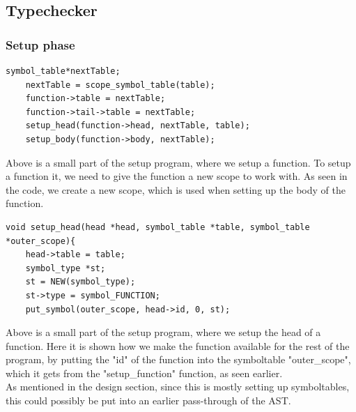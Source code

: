 \documentclass[a4paper,10pt,titlepage]{report}
\begin{document}
\newpage

\subsection{Typechecker}
\subsubsection{Setup phase}
\begin{lstlisting}
symbol_table*nextTable;
    nextTable = scope_symbol_table(table);
    function->table = nextTable;
    function->tail->table = nextTable;
    setup_head(function->head, nextTable, table);
    setup_body(function->body, nextTable);
\end{lstlisting}
Above is a small part of the setup program, where we setup a function. To setup a function it, we need to give the function a new scope to work with. As seen in the code, we create a new scope, which is used when setting up the body of the function.  
\begin{lstlisting}
void setup_head(head *head, symbol_table *table, symbol_table *outer_scope){
    head->table = table;
    symbol_type *st;
    st = NEW(symbol_type);
    st->type = symbol_FUNCTION;
    put_symbol(outer_scope, head->id, 0, st);
\end{lstlisting}
Above is a small part of the setup program, where we setup the head of a function. Here it is shown how we make the function available for the rest of the program, by putting the "id" of the function into the symboltable "outer\_scope", which it gets from the "setup\_function" function, as seen earlier.\\
As mentioned in the design section, since this is mostly setting up symboltables, this could possibly be put into an earlier pass-through of the AST.
\end{document}
